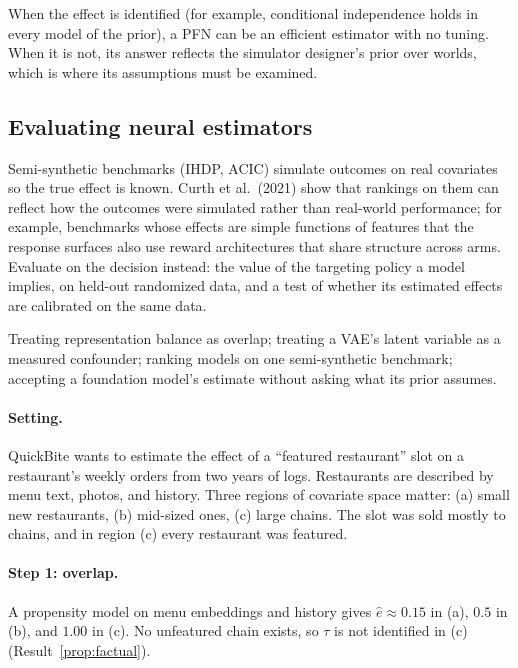 \documentclass[11pt]{article}
\begin{document}
When the effect is identified (for example, conditional independence holds in every model of the prior), a PFN can
be an efficient estimator with no tuning. When it is not, its answer reflects the simulator designer's prior over
worlds, which is where its assumptions must be examined.

\subsection{Evaluating neural estimators}

Semi-synthetic benchmarks (IHDP, ACIC) simulate outcomes on real covariates so the true effect is known. Curth et al.\
(2021) show that rankings on them can reflect how the outcomes were simulated rather than real-world performance; for
example, benchmarks whose effects are simple functions of features that the response surfaces also use reward
architectures that share structure across arms. Evaluate on the decision instead: the value of the targeting policy a
model implies, on held-out randomized data, and a test of whether its estimated effects are calibrated on
the same data.

\begin{pitfall}
Treating representation balance as overlap; treating a VAE's latent variable as a measured confounder; ranking models
on one semi-synthetic benchmark; accepting a foundation model's estimate without asking what its prior assumes.
\end{pitfall}

\sectiontwo

\paragraph{Setting.} QuickBite wants to estimate the effect of a ``featured restaurant'' slot on a restaurant's weekly
orders from two years of logs. Restaurants are described by menu text, photos, and history. Three regions of covariate
space matter: (a) small new restaurants, (b) mid-sized ones, (c) large chains. The slot was sold mostly to chains, and in
region (c) every restaurant was featured.

\paragraph{Step 1: overlap.} A propensity model on menu embeddings and history gives $\hat e \approx 0.15$ in (a), $0.5$ in
(b), and $1.00$ in (c). No unfeatured chain exists, so $\tau$ is not identified in (c) (Result~\ref{prop:factual}).
\end{document}
